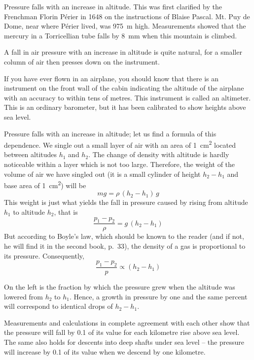 Pressure falls with an increase in altitude. This was first clarified by the Frenchman Florin P\'erier in 1648 on the instructions of Blaise Pascal. Mt. Puy de Dome, near where P\'erier lived, was \SI{975}{\meter} high. Measurements showed that the mercury in a Torricellian tube falls by \SI{8}{\milli\meter} when this mountain is climbed.


A fall in air pressure with an increase in altitude is
quite natural, for a smaller column of air then presses
down on the instrument.

If you have ever flown in an airplane, you should know
that there is an instrument on the front wall of the cabin
indicating the altitude of the airplane with an accuracy
to within tens of metres. This instrument is called an
altimeter. This is an ordinary barometer, but it has been
calibrated to show heights above sea level.

Pressure falls with an increase in altitude; let us find
a formula of this dependence. We single out a small
layer of air with an area of \SI{1}{\centi\meter\squared}  located between altitudes $h_{1}$ and $h_{2}$. The change of density with altitude is hardly noticeable within a layer which is not too large. Therefore, the weight of the volume of air we have singled
out (it is a small cylinder of height $h_{2} - h_{1}$ and base area of \SI{1}{\centi\meter\squared}) will be
\begin{equation*}%
mg = \rho \, (h_{2} - h_{1}) \, g
\end{equation*}
This weight is just what yields the fall in pressure caused by rising from altitude $h_{1}$ to altitude $h_{2}$, that is
\begin{equation*}%
\dfrac{p_{1} - p_{2}}{\rho} = g \, (h_{2} - h_{1}) 
\end{equation*}
But according to Boyle's law, which should be known to the reader (and if not, he will find it in the second book, p.~33), the density of a gas is proportional to its pressure. Consequently,
\begin{equation*}%
\dfrac{p_{1} - p_{2}}{p} \propto  (h_{2} - h_{1}) 
\end{equation*}

On the left is the fraction by which the pressure grew when the altitude was lowered from $h_{2}$ to $h_{1}$. Hence, a growth in pressure by one and the same percent will correspond to identical drops of $h_{2} - h_{1}$.

Measurements and calculations in complete agreement with each other show that the pressure will fall by 0.1 of its value for each kilometre rise above sea level. The same also holds for descents into deep shafts under sea level -- the pressure will increase by 0.1 of its value when we descend by one kilometre.

